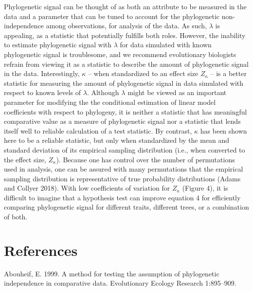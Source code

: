 \documentclass[]{article}
\begin{document}
Phylogenetic signal can be thought of as both an attribute to be
measured in the data and a parameter that can be tuned to account for
the phylogenetic non-independence among observations, for analysis of
the data. As such, \(\lambda\) is appealing, as a statistic that
potentially fulfills both roles. However, the inability to estimate
phylogenetic signal with \(\lambda\) for data simulated with known
phylogenetic signal is troublesome, and we recommend evolutionary
biologists refrain from viewing it as a statistic to describe the amount
of phylogenetic signal in the data. Interestingly, \(\kappa\) -- when
standardized to an effect size \(Z_\kappa\) -- is a better statistic for
measuring the amount of phylogenetic signal in data simulated with
respect to known levels of \(\lambda\). Although \(\lambda\) might be
viewed as an important parameter for modifying the the conditional
estimation of linear model coefficients with respect to phylogeny, it is
neither a statistic that has meaningful comparative value as a measure
of phylogenetic signal nor a statistic that lends itself well to
reliable calculation of a test statistic. By contrast, \(\kappa\) has
been shown here to be a reliable statistic, but only when standardized
by the mean and standard deviation of its empirical sampling
distribution (i.e., when converted to the effect size, \(Z_\kappa\)).
Because one has control over the number of permutations used in
analysis, one can be assured with many permutations that the empirical
sampling distribution is representative of true probability
distributions (Adams and Collyer 2018). With low coefficients of
variation for \(Z_\kappa\) (Figure 4), it is difficult to imagine that a
hypothesis test can improve equation 4 for efficiently comparing
phylogenetic signal for different traits, different trees, or a
combination of both.

\newpage

\hypertarget{references}{%
\section{References}\label{references}}

\setlength{\parindent}{-0.25in} \setlength{\leftskip}{0.25in}
\setlength{\parskip}{8pt} \noindent

\hypertarget{refs}{}
\leavevmode\hypertarget{ref-Abouheif1999}{}%
Abouheif, E. 1999. A method for testing the assumption of phylogenetic
independence in comparative data. Evolutionary Ecology Research
1:895--909.
\end{document}
